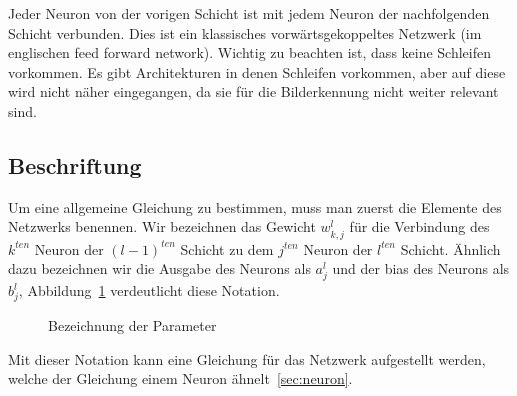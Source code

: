 \documentclass[12pt,a4paper]{report}
\begin{document}
Jeder Neuron von der vorigen Schicht ist mit jedem Neuron der nachfolgenden Schicht verbunden.
Dies ist ein klassisches vorwärtsgekoppeltes Netzwerk (im englischen feed forward network).
Wichtig zu beachten ist, dass keine Schleifen vorkommen.
Es gibt Architekturen in denen Schleifen vorkommen, aber auf diese wird nicht näher eingegangen, da sie für die
Bilderkennung nicht weiter relevant sind.

\subsection{Beschriftung}

Um eine allgemeine Gleichung zu bestimmen, muss man zuerst die Elemente des Netzwerks benennen.
Wir bezeichnen das Gewicht $w^l_{k,j}$ für die Verbindung des $k^{ten}$ Neuron der $(l-1)^{ten}$ Schicht
zu dem $j^{ten}$ Neuron der $l^{ten}$ Schicht.
Ähnlich dazu bezeichnen wir die Ausgabe des Neurons als $a^l_j$ und der bias des Neurons als $b^l_j$,
Abbildung~\ref{fig:network3} verdeutlicht diese Notation.

\begin{figure}[h]
    \centering
{}
    \caption{Bezeichnung der Parameter}
    \label{fig:network3}
\end{figure}
Mit dieser Notation kann eine Gleichung für das Netzwerk aufgestellt werden, welche der Gleichung einem Neuron ähnelt~\ref{sec:neuron}.
\end{document}
